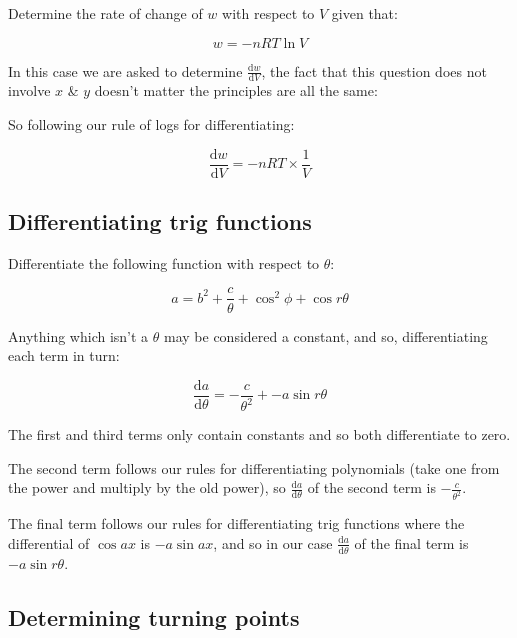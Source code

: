 \documentclass[
]{book}
\begin{document}
Determine the rate of change of \(w\) with respect to \(V\) given that:

\begin{equation*}
w=-nRT \ln V
\end{equation*}

In this case we are asked to determine \(\tfrac{\textrm{d}w}{\textrm{d}V}\), the fact that this question does not involve \(x\) \& \(y\) doesn't matter the principles are all the same:

So following our rule of logs for differentiating:

\begin{equation*}
\frac{\textrm{d}w}{\textrm{d}V}= -nRT \times \frac{1}{V}
\end{equation*}

\hypertarget{subsec:exdifftrig}{%
\subsection{Differentiating trig functions}\label{subsec:exdifftrig}}

Differentiate the following function with respect to \(\theta\):

\begin{equation*}
a= b^2 + \frac{c}{\theta}+ \cos^2 \phi + \cos r\theta
\end{equation*}

Anything which isn't a \(\theta\) may be considered a constant, and so, differentiating each term in turn:

\begin{equation*}
\frac{\textrm{d}a}{\textrm{d}\theta}= - \frac{c}{\theta^2}+ -a\sin r\theta
\end{equation*}

The first and third terms only contain constants and so both differentiate to zero.

The second term follows our rules for differentiating polynomials (take one from the power and multiply by the old power), so \(\tfrac{\textrm{d}a}{\textrm{d}\theta}\) of the second term is \(- \frac{c}{\theta^2}\).

The final term follows our rules for differentiating trig functions where the differential of \(\cos ax\) is \(-a \sin ax\), and so in our case \(\tfrac{\textrm{d}a}{\textrm{d}\theta}\) of the final term is \(-a\sin r\theta\).

\hypertarget{subsec:exturningpoints}{%
\subsection{Determining turning points}\label{subsec:exturningpoints}}
\end{document}
